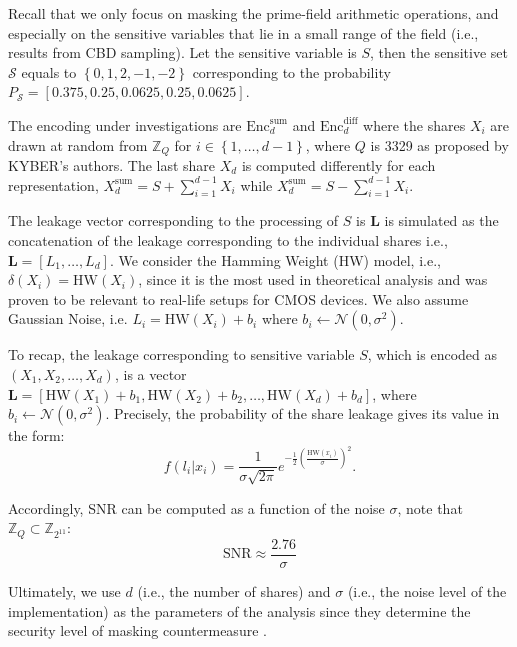 \documentclass{llncs}
\begin{document}
	Recall that we only focus on masking the prime-field arithmetic operations, and especially on the sensitive variables that lie in a small range of the field (i.e., results from CBD sampling). Let the sensitive variable is $S$, then the sensitive set $\mathcal{S}$ equals to $\left\lbrace 0, 1, 2, -1, -2 \right\rbrace $ corresponding to the probability $P_{\mathcal{S}} = [ 0.375,  0.25,   0.0625, 0.25,   0.0625]$. 
	
	The encoding under investigations are $\text{Enc}^{\text{sum}}_{d}$ and $\text{Enc}^{\text{diff}}_{d}$ where the shares $X_i$ are drawn at random from $\mathbb{Z}_Q$ for $i \in \left\lbrace 1, \dots, d-1\right\rbrace $, where $Q$ is 3329 as proposed by KYBER's authors. The last share $X_d$ is computed differently for each representation, $X_d^{\text{sum}} = S + \sum_{i = 1}^{d-1} X_i$ while $X_d^{\text{sum}} = S - \sum_{i = 1}^{d-1} X_i$.
	
	The leakage vector corresponding to the processing of $S$ is $\bm{L}$ is simulated as the concatenation of the leakage corresponding to the individual shares i.e., $\bm{L} = \left[ L_1, \dots, L_d \right] $. We consider the Hamming Weight (HW) model, i.e., $\delta(X_i) = \text{HW}(X_i)$, since it is the most used in theoretical analysis \cite{2dpa} and was proven to be relevant to real-life setups for CMOS devices. We also assume Gaussian Noise, i.e. $L_i = \text{HW}(X_i) + b_i$ where $b_i \leftarrow \mathcal{N}(0, \sigma^2)$. 
	
	To recap, the leakage corresponding to sensitive variable $S$, which is encoded as $(X_1, X_2, \dots, X_d)$, is a vector $\bm{L} = \left[ \text{HW}(X_1) + b_1, \text{HW}(X_2) + b_2, \dots, \text{HW}(X_d) + b_d \right] $, where $b_i \leftarrow \mathcal{N}(0, \sigma^2) $. Precisely, the probability of the share leakage gives its value in the form:
	\begin{equation}\label{eq:gl}
		f(l_i|x_i) = \frac{1}{\sigma\sqrt{2\pi}} e^{ -\frac{1}{2}\left( \frac{\text{HW}(x_i)}{\sigma}\right) ^2 }.
	\end{equation}
	
	Accordingly, SNR can be computed as a function of the noise $\sigma$, note that $\mathbb{Z}_Q \subset \mathbb{Z}_{2^{11}}$:
	$$\text{SNR} \approx \frac{2.76}{\sigma}$$
	
	Ultimately, we use $d$ (i.e., the number of shares) and $\sigma$ (i.e., the noise level of the implementation) as the parameters of the analysis since they determine the security level of masking countermeasure .
	
\end{document}
